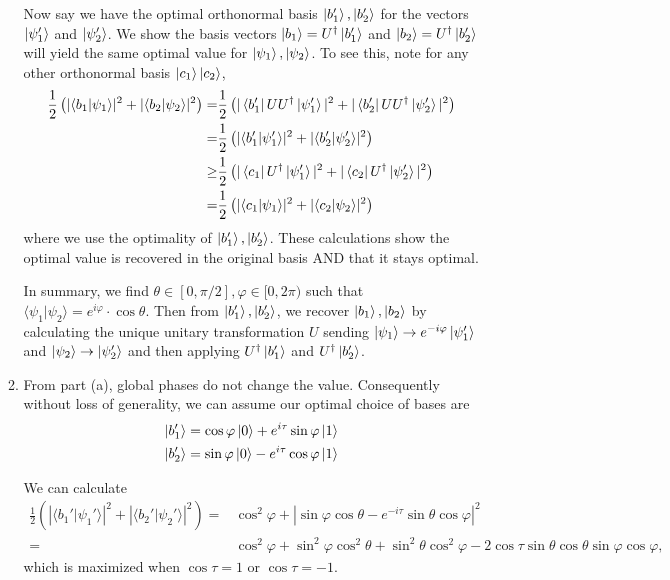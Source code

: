 \documentclass[12pt]{article}
\begin{document}
\begin{enumerate}
\begin{enumerate}
		Now say we have the optimal orthonormal basis $\ket{b_1'}, \ket{b_2'}$ for the  vectors $\ket{\psi_1'}$ and $\ket{\psi_2'}$. We show the basis vectors $\ket{b_1} = U^\dagger \ket{b_1'}$ and $\ket{b_2} = U^\dagger \ket{b_2'}$ will yield the same optimal value for $\ket{\psi_1}, \ket{\psi_2}$. To see this, note for any other orthonormal basis $\ket{c_1} \ket{c_2}$,
		\begin{align*}
			\frac{1}{2}\left(|\langle b_1 \vert \psi_1 \rangle|^2 + |\langle b_2 \vert \psi_2 \rangle|^2\right) =& \frac{1}{2}\left(|\bra{b_1'} U U^\dagger \ket{\psi_1'}|^2 + |\bra{b_2'} U U^\dagger \ket{\psi_2'}|^2\right)\\
			=& \frac{1}{2}\left(|\langle b_1' \vert \psi_1'\rangle|^2 + |\langle b_2' \vert \psi_2' \rangle|^2\right)\\
			\ge& \frac{1}{2}\left(|\bra{c_1} U^\dagger \ket{\psi_1'}|^2 + |\bra{c_2} U^\dagger \ket{ \psi_2'}|^2\right)\\
			=& \frac{1}{2}\left(|\langle c_1 \vert \psi_1 \rangle|^2 + |\langle c_2 \vert \psi_2 \rangle|^2\right)
		\end{align*}
		where we use the optimality of $\ket{b_1'}, \ket{b_2'}$. These calculations show the optimal value is recovered in the original basis AND that it stays optimal.
		
		In summary, we find $\theta \in [0, \pi/2], \varphi \in [0, 2\pi)$ such that $\langle \psi_1 \vert \psi_2 \rangle = e^{i\varphi} \cdot \cos \theta$. Then from $\ket{b_1'}, \ket{b_2'}$, we recover $\ket{b_1}, \ket{b_2}$ by calculating the unique unitary transformation $U$ sending $\ket{\psi_1} \to e^{-i\varphi}\ket{\psi_1'}$ and $\ket{\psi_2} \to \ket{\psi_2'}$ and then applying $U^\dagger\ket{b_1'}$ and $U^\dagger \ket{b_2'}$.
	\item From part (a), global phases do not change the value. Consequently without loss of generality, we can assume our optimal choice of bases are
	\begin{align*}
	\ket{b_1'} &= \cos \varphi \ket{0} + e^{i\tau}\sin\varphi \ket{1}\\
	\ket{b_2'} &= \sin \varphi \ket{0} - e^{i\tau}\cos\varphi \ket{1}
	\end{align*}
	
	We can calculate
	\begin{align*}
	\frac{1}{2}\left(|\langle b_1' \vert \psi_1'\rangle|^2 + |\langle b_2' \vert \psi_2' \rangle|^2\right) =& \cos^2\varphi + |\sin \varphi \cos \theta - e^{-i\tau}\sin\theta	\cos \varphi|^2\\
	=& \cos^2  \varphi + \sin^2\varphi \cos^2\theta + \sin^2 \theta \cos^2 \varphi - 2\cos \tau \sin\theta \cos\theta \sin\varphi \cos \varphi,
	\end{align*}
	which is maximized when $\cos \tau = 1$ or $\cos \tau = -1$.
	

\end{enumerate}
\end{enumerate}
\end{document}
